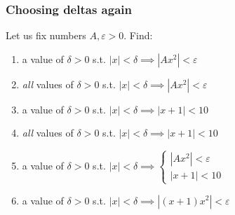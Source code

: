 \documentclass[14pt]{beamer}
\begin{document}

	\begin{frame}[t]
		\frametitle{Choosing deltas again}

		Let us fix numbers $A, \varepsilon >0$. Find:

		\vfill

		\begin{enumerate}
			\item a value of $\delta >0$ \; s.t. \hfill
				$\displaystyle |x|< \delta \implies |Ax^{2}|<\varepsilon$
				\vfill

			\item \emph{all} values of $\delta >0$ \; s.t. \hfill $\displaystyle |x|< \delta
				\implies |Ax^{2}|<\varepsilon$
				\vfill

			\item a value of $\delta >0$ \; s.t. \hfill
				$\displaystyle |x|< \delta \implies |x+1| < 10$
				\vfill

			\item \emph{all} values of $\delta >0$ \; s.t. \hfill $\displaystyle |x|< \delta
				\implies |x+1| < 10$
				\vfill

			\item a value of $\delta >0$ \; s.t. \hfill
				$\displaystyle |x|< \delta \implies \left\{
				\begin{array}{c}
					|Ax^2|<\varepsilon \\
					|x+1| < 10
				\end{array}
				\right.$
				\vfill

			\item a value of $\delta >0$ \; s.t. \hfill
				$\displaystyle |x| < \delta \implies |(x+1)x^{2}| < \varepsilon$
				\vfill
		\end{enumerate}
	\end{frame}

\end{document}
